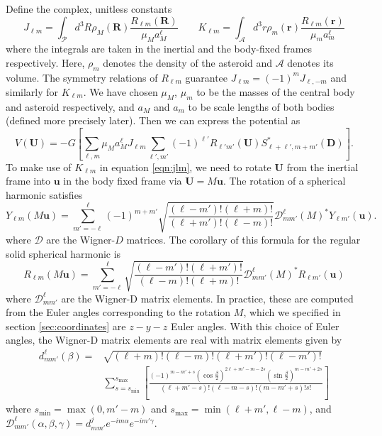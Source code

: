 \documentclass[11pt]{article}
\newcommand{\parens}[1]{\left( #1 \right)}
\newcommand{\brackets}[1]{\left[ #1 \right]}
\begin{document}
Define the complex, unitless constants
\begin{equation}
J_{\ell m} = \int_\mathcal{P} d^3 R \rho_M(\bm R) \frac{R_{\ell m}(\bm R)}{\mu_M a_M^\ell}
\qquad
K_{\ell m} = \int_\mathcal{A} d^3 r \rho_m(\bm r) \frac{R_{\ell m}(\bm r)}{\mu_m a_m^\ell}
\label{eqn:jlm}
\end{equation}
where the integrals are taken in the inertial and the body-fixed frames respectively. Here, $\rho_m$ denotes the density of the asteroid and $\mathcal{A}$ denotes its volume. The symmetry relations of $R_{\ell m}$ guarantee $J_{\ell m} = (-1)^m J_{\ell, -m}$ and similarly for $K_{\ell m}$. We have chosen $\mu_M$, $\mu_m$ to be the masses of the central body and asteroid respectively, and $a_M$ and $a_m$ to be scale lengths of both bodies (defined more precisely later). Then we can express the potential as
\begin{equation}
V(\bm U) = -G \brackets{\sum_{\ell, m} \mu_M a_M^\ell J_{\ell m} \sum_{\ell', m'} (-1)^{\ell'}R_{\ell' m'}(\bm U)S^*_{\ell+\ell', m + m'} (\bm D)}.
\label{eqn:pe-unrotated}
\end{equation}
To make use of $K_{\ell m}$ in equation \ref{eqn:jlm}, we need to rotate $\bm U$ from the inertial frame into $\bm u$ in the body fixed frame via $\bm U = M \bm u$. The rotation of a spherical harmonic satisfies
\begin{equation}
Y_{\ell m}(M\bm u) = \sum_{m'=-\ell}^\ell (-1)^{m+m'}\sqrt{\frac{(\ell-m')!(\ell+m)!}{(\ell+m')!(\ell-m)!}} \mathcal{D}^\ell_{mm'}(M)^* Y_{\ell m'}(\bm u).
\end{equation}
where $\mathcal{D}$ are the Wigner-$D$ matrices. The corollary of this formula for the regular solid spherical harmonic is
\begin{equation}
R_{\ell m} (M \bm u) = \sum_{m'=-\ell}^\ell \sqrt{\frac{(\ell-m')!(\ell+m')!}{(\ell-m)!(\ell+m)!}} \mathcal{D}^\ell_{mm'}(M)^* R_{\ell m'} (\bm u)
\label{eqn:rlm-rotations}
\end{equation}
where $\mathcal{D}^\ell_{mm'}$ are the Wigner-D matrix elements. In practice, these are computed from the Euler angles corresponding to the rotation $M$, which we specified in section \ref{sec:coordinates} are $z-y-z$ Euler angles. With this choice of Euler angles, the Wigner-D matrix elements are real with matrix elements given by
\begin{equation}
\begin{aligned}
d^\ell_{mm'}(\beta) = &\sqrt{(\ell+m)!(\ell-m)!(\ell+m')!(\ell-m')!}\\
& \sum_{s=s_\text{min}}^{s_\text{max}} \brackets{\frac{(-1)^{m-m'+s}\parens{\cos\frac{\beta}{2}}^{2\ell + m' - m - 2s}\parens{\sin \frac{\beta}{2}}^{m-m'+2s}}{(\ell+m'-s)!(\ell-m-s)!(m-m'+s)!s!}}
\end{aligned}
\label{eqn:wigner-d-elements}
\end{equation}
where $s_\text{min} = \max(0, m'-m)$ and $s_\text{max} = \min(\ell+m', \ell-m)$,
and $\mathcal{D}^\ell_{mm'}(\alpha, \beta, \gamma) = d^j_{mm'}e^{-im\alpha} e^{-im'\gamma}$.
\end{document}

